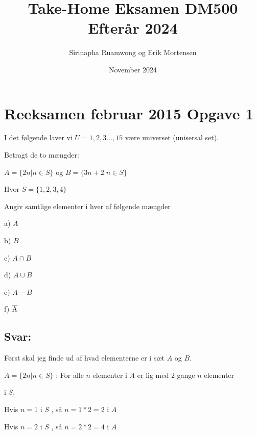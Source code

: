 \documentclass{article}
\title{Take-Home Eksamen DM500 Efterår 2024}
\author{Sirinapha Ruamwong og Erik Mortensen}
\date{November 2024}
\begin{document}
\maketitle

\section{Reeksamen februar 2015 Opgave 1 }

I det følgende laver vi $U = {1,2,3...,15}$ være universet (unisersal set). 
\vspace{10pt}


Betragt de to mængder:


$A = {\{2n | n\in S\}}$  og  $   B = {\{3n + 2| n \in S\}}$ 
\vspace{11pt}

Hvor $S = \{1,2,3,4\}$
\vspace{11pt}

Angiv samtlige elementer i hver af følgende mængder
\vspace{11pt}

a) $A$
\vspace{10pt}

b) $B$
\vspace{10pt}

c) $A \cap B$
\vspace{10pt}

 d) $A \cup B$
\vspace{10pt}

 e) $A - B$
\vspace{10pt}

 f) $\overline{\rm A}$  
\vspace{11pt}

 \subsection{Svar:}
 \vspace{11pt}
 Først skal jeg finde ud af hvad elementerne er i sæt $A$ og $B$.
 \vspace{10pt}

 $A = {\{2n | n\in S\}}$ : For alle $n$ elementer i $A$ er lig med $2$ gange $n$ elementer 
 
 i $S$.
\vspace{10pt}

Hvis $n = 1$ i $S$ , så $n = 1  *  2 = 2$ i $A$
\vspace{10pt}

Hvis $n = 2$ i $S$ , så $n = 2  *  2 = 4$ i $A$ 
\vspace{10pt}
\end{document}
